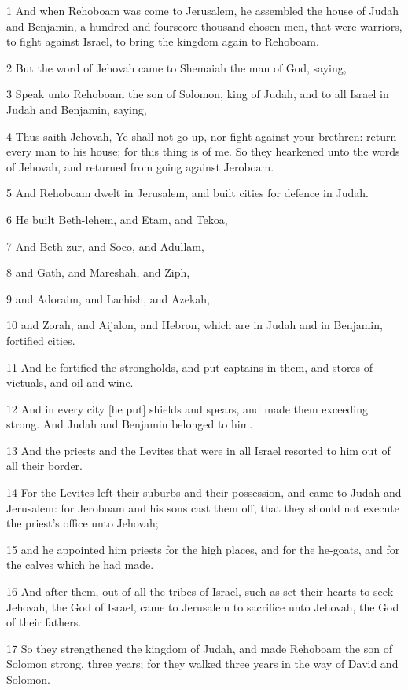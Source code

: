 \par 1 And when Rehoboam was come to Jerusalem, he assembled the house of Judah and Benjamin, a hundred and fourscore thousand chosen men, that were warriors, to fight against Israel, to bring the kingdom again to Rehoboam.
\par 2 But the word of Jehovah came to Shemaiah the man of God, saying,
\par 3 Speak unto Rehoboam the son of Solomon, king of Judah, and to all Israel in Judah and Benjamin, saying,
\par 4 Thus saith Jehovah, Ye shall not go up, nor fight against your brethren: return every man to his house; for this thing is of me. So they hearkened unto the words of Jehovah, and returned from going against Jeroboam.
\par 5 And Rehoboam dwelt in Jerusalem, and built cities for defence in Judah.
\par 6 He built Beth-lehem, and Etam, and Tekoa,
\par 7 And Beth-zur, and Soco, and Adullam,
\par 8 and Gath, and Mareshah, and Ziph,
\par 9 and Adoraim, and Lachish, and Azekah,
\par 10 and Zorah, and Aijalon, and Hebron, which are in Judah and in Benjamin, fortified cities.
\par 11 And he fortified the strongholds, and put captains in them, and stores of victuals, and oil and wine.
\par 12 And in every city [he put] shields and spears, and made them exceeding strong. And Judah and Benjamin belonged to him.
\par 13 And the priests and the Levites that were in all Israel resorted to him out of all their border.
\par 14 For the Levites left their suburbs and their possession, and came to Judah and Jerusalem: for Jeroboam and his sons cast them off, that they should not execute the priest's office unto Jehovah;
\par 15 and he appointed him priests for the high places, and for the he-goats, and for the calves which he had made.
\par 16 And after them, out of all the tribes of Israel, such as set their hearts to seek Jehovah, the God of Israel, came to Jerusalem to sacrifice unto Jehovah, the God of their fathers.
\par 17 So they strengthened the kingdom of Judah, and made Rehoboam the son of Solomon strong, three years; for they walked three years in the way of David and Solomon.
